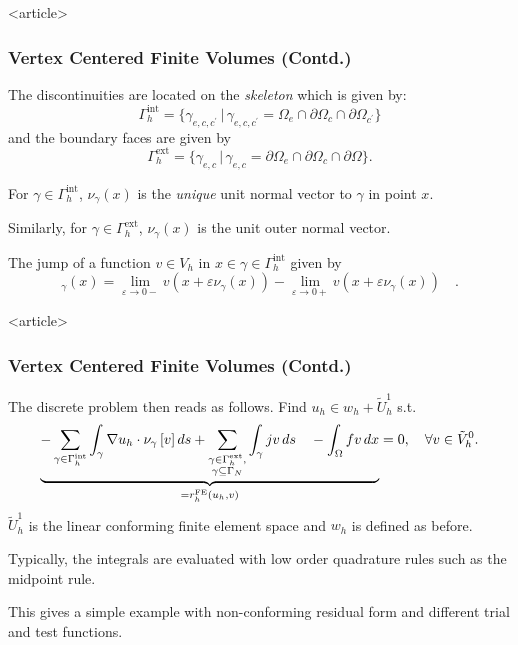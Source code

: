 \begin{frame}<article>
\frametitle<presentation>{Vertex Centered Finite Volumes (Contd.)}
The discontinuities are located on the \textit{skeleton} which is given by:
\begin{equation*}
\Gamma_h^{\text{int}} = \{\gamma_{e,c,c^\prime} \,|\,
\gamma_{e,c,c^\prime} = \Omega_e \cap \partial\Omega_c \cap
\partial\Omega_{c^\prime} \}
\end{equation*}
and the boundary faces are given by
\begin{equation*}
\Gamma_h^{\text{ext}} = \{\gamma_{e,c} \,|\,
\gamma_{e,c} = \partial\Omega_e \cap \partial\Omega_c \cap
\partial\Omega \}.
\end{equation*}

For $\gamma\in\Gamma_h^{\text{int}}$, $\nu_\gamma(x)$ is
the \textit{unique} unit
normal vector to $\gamma$ in point $x$. 

Similarly, for
$\gamma\in\Gamma_h^{\text{ext}}$, $\nu_\gamma(x)$ is the unit outer
normal vector.

The jump of a function $v\in V_h$ in
$x\in\gamma\in\Gamma_h^{\text{int}}$ given by
\begin{equation*}
[v]_\gamma(x) = \lim_{\varepsilon\to 0-} v(x+\varepsilon \nu_\gamma(x))
-  \lim_{\varepsilon\to 0+} v(x+\varepsilon \nu_\gamma(x))\quad.
\end{equation*}
\end{frame}

\begin{frame}<article>
\frametitle<presentation>{Vertex Centered Finite Volumes (Contd.)}
The discrete problem then reads as follows. Find $u_h\in w_h+\tilde{U}_h^1$ s.t.
\begin{equation}
\underbrace{- \sum_{\gamma\in\Gamma_h^{\text{int}}} \int_\gamma
\nabla u_h \cdot \nu_\gamma \,[v]\,d s
+ \sum_{\substack{\gamma\in\Gamma_h^{\text{ext}},\\ \gamma\subseteq\Gamma_N}}
\int_\gamma j v \,d s\quad
- \int_\Omega fv \,d x}_{= r_h^\text{FE}(u_h,v)} = 0,
\quad \forall v\in \tilde{V}_h^0.
\end{equation}
$\tilde{U}_h^1$ is the linear conforming finite element space and $w_h$ is
defined as before.

Typically, the integrals are evaluated with low order quadrature rules
such as the midpoint rule.

This gives a simple example with non-conforming residual form and
different trial and test functions.
\end{frame}


